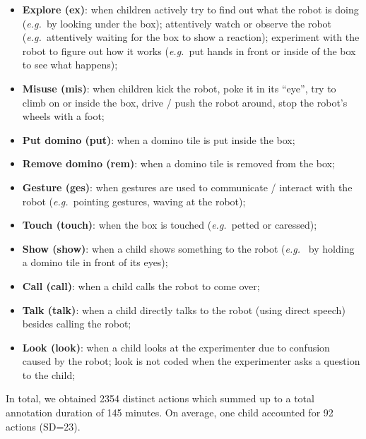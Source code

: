 \documentclass{sig-alternate}
\newcommand{\eg}{{\textit{e.g.~}}}
\begin{document}
\begin{itemize}

    \item \textbf{Explore (ex)}: when children actively try to find out what the
        robot is doing (\eg by looking under the box); attentively watch or
        observe the robot (\eg attentively waiting for the box to show a
        reaction); experiment with the robot to figure out how it works (\eg put
        hands in front or inside of the box to see what happens);

    \item \textbf{Misuse (mis)}: when children kick the robot, poke it in its
        ``eye'', try to climb on or inside the box, drive / push the robot
        around, stop the robot's wheels with a foot;

    \item \textbf{Put domino (put)}: when a domino tile is put inside the box;

    \item \textbf{Remove domino (rem)}: when a domino tile is removed from the
        box;

    \item \textbf{Gesture (ges)}: when gestures are used to communicate /
        interact with the robot (\eg pointing gestures, waving at the robot);

    \item \textbf{Touch (touch)}: when the box is touched (\eg petted or
        caressed);

    \item \textbf{Show (show)}: when a child shows something to the robot (\eg
        by holding a domino tile in front of its eyes);

    \item \textbf{Call (call)}: when a child calls the robot to come over;

    \item \textbf{Talk (talk)}: when a child directly talks to the robot (using
        direct speech) besides calling the robot;

    \item \textbf{Look (look)}:	when a child looks at the experimenter due to
        confusion caused by the robot; look is not coded when the experimenter
        asks a question to the child;

\end{itemize}

In total, we obtained 2354 distinct actions which summed up to a total
annotation duration of 145 minutes. On average, one child accounted for 92
actions (SD=23).
\end{document}
